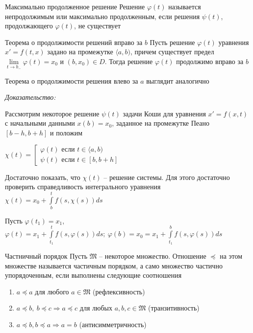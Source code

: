 \documentclass[12pt]{article}
\begin{document}
\begin{defin}{Максимально продолженное решение}
    Решение $\varphi(t)$ называется непродолжимым или максимально продолженным, если решения $\psi(t)$, продолжающего $\varphi(t)$, не существует
\end{defin}

\begin{theo}{Теорема о продолжимости решений вправо за $b$}
    Пусть решение $\varphi(t)$ уравнения $x' = f(t, x)$ задано на промежутке $\langle a, b)$, причем существует предел $\lim\limits_{t \to b_-} \varphi(t) = x_0$ и $(b, x_0) \in D$. Тогда решение $\varphi(t)$ продолжимо вправо за $b$

    Теорема о продолжимости решения влево за $a$ выглядит аналогично
\end{theo}

\newpage

\textit{Доказательство:}

Рассмотрим некоторое решение $\psi(t)$ задачи Коши для уравнения $x' = f(x, t)$ с начальными данными $x(b) = x_0$, заданное на промежутке Пеано $[b - h, b + h]$ и положим 

$\chi(t) = \left[ \begin{gathered}
    \varphi(t) \text{ если } t \in \langle a, b) \\
    \psi(t) \text{ если } t \in [b, b + h]
\end{gathered} \right.$

Достаточно показать, что $\chi(t)$ -- решение системы. Для этого достаточно проверить справедливость интегрального уравнения $\chi(t) = x_0 + \int\limits_b^t f(s, \chi(s))ds$

Пусть $\varphi(t_1) = x_1$, $\varphi(t) = x_1 + \int\limits_{t_1}^t f(s, \varphi(s))ds;\ \varphi(b) = x_0 = x_1 + \int\limits_{t_1}^b f(s, \varphi(s))ds$

\begin{defin}{Частничный порядок}
    Пусть $\mathfrak{M}$ -- некоторое множество. Отношение $\preccurlyeq$ на этом множестве называется частичным порядком, а само множество частично упорядоченным, если выполнены следующие соотношения

    \begin{enumerate}
        \item $a \preccurlyeq a$ для любого $a \in \mathfrak{M}$ (рефлексивность)
        \item $a \preccurlyeq b,\ b \preccurlyeq c \Rightarrow a \preccurlyeq c$ для любых $a, b, c \in \mathfrak{M}$ (транзитивность)
        \item $a \preccurlyeq b, b \preccurlyeq a \Rightarrow a = b$ (антисимметричность)
    \end{enumerate}
\end{defin}
\end{document}
